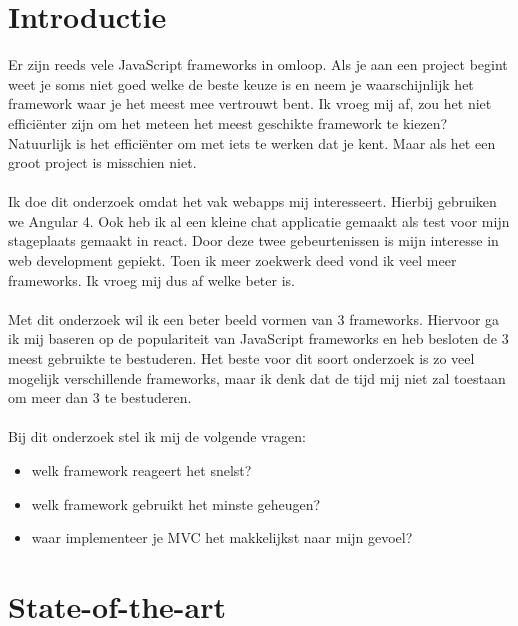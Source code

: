 
\section{Introductie} %
\label{sec:introductie}
Er zijn reeds vele JavaScript frameworks in omloop. Als je aan een project begint weet je soms niet goed welke de beste keuze is en neem je waarschijnlijk het framework waar je het meest mee vertrouwt bent. Ik vroeg mij af, zou het niet efficiënter zijn om het meteen het meest geschikte framework te kiezen? Natuurlijk is het efficiënter om met iets te werken dat je kent. Maar als het een groot project is misschien niet.\\
\\
Ik doe dit onderzoek omdat het vak webapps mij interesseert. Hierbij gebruiken we Angular 4. Ook heb ik al een kleine chat applicatie gemaakt als test voor mijn stageplaats gemaakt in react. Door deze twee gebeurtenissen is mijn interesse in web development gepiekt. Toen ik meer zoekwerk deed vond ik veel meer frameworks. Ik vroeg mij dus af welke beter is.\\
\\
Met dit onderzoek wil ik een beter beeld vormen van 3 frameworks. Hiervoor ga ik mij baseren op de populariteit van JavaScript frameworks en heb besloten de 3 meest gebruikte te bestuderen. Het beste voor dit soort onderzoek is zo veel mogelijk verschillende frameworks, maar ik denk dat de tijd mij niet zal toestaan om meer dan 3 te bestuderen.\\
\\
Bij dit onderzoek stel ik mij de volgende vragen:
\begin{itemize}
	\item welk framework reageert het snelst?
	\item welk framework gebruikt het minste geheugen?
	\item waar implementeer je MVC het makkelijkst naar mijn gevoel?
\end{itemize}


\section{State-of-the-art}
\label{sec:state-of-the-art}

